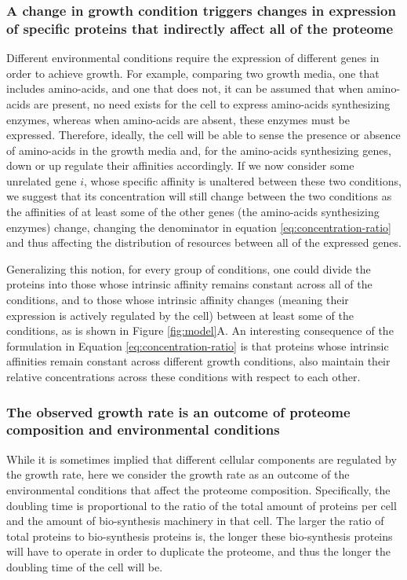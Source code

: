 \documentclass[a4paper]{article}
\begin{document}
\subsubsection{A change in growth condition triggers changes in expression of specific proteins that indirectly affect all of the proteome}
Different environmental conditions require the expression of different genes in order to achieve growth.
For example, comparing two growth media, one that includes amino-acids, and one that does not, it can be assumed that when amino-acids are present, no need exists for the cell to express amino-acids synthesizing enzymes, whereas when amino-acids are absent, these enzymes must be expressed.
Therefore, ideally, the cell will be able to sense the presence or absence of amino-acids in the growth media and, for the amino-acids synthesizing genes, down or up regulate their affinities accordingly.
If we now consider some unrelated gene $i$, whose specific affinity is unaltered between these two conditions, we suggest that its concentration will still change between the two conditions as the affinities of at least some of the other genes (the amino-acids synthesizing enzymes) change, changing the denominator in equation \ref{eq:concentration-ratio} and thus affecting the distribution of resources between all of the expressed genes.


Generalizing this notion, for every group of conditions, one could divide the proteins into those whose intrinsic affinity remains constant across all of the conditions, and to those whose intrinsic affinity changes (meaning their expression is actively regulated by the cell) between at least some of the conditions, as is shown in Figure \ref{fig:model}A.
An interesting consequence of the formulation in Equation \ref{eq:concentration-ratio} is that proteins whose intrinsic affinities remain constant across different growth conditions, also maintain their relative concentrations across these conditions with respect to each other.

\subsubsection{The observed growth rate is an outcome of proteome composition and environmental conditions}
While it is sometimes implied that different cellular components are regulated by the growth rate, here we consider the growth rate as an outcome of the environmental conditions that affect the proteome composition.
Specifically, the doubling time is proportional to the ratio of the total amount of proteins per cell and the amount of bio-synthesis machinery in that cell.
The larger the ratio of total proteins to bio-synthesis proteins is, the longer these bio-synthesis proteins will have to operate in order to duplicate the proteome, and thus the longer the doubling time of the cell will be.
\end{document}
